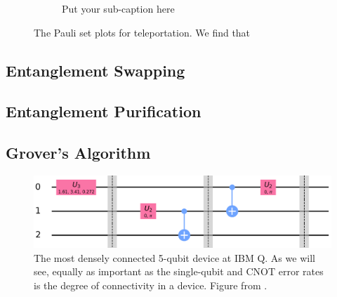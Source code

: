 \begin{figure}
\begin{subfigure}{.5\textwidth}
    \caption{Put your sub-caption here}
    \label{fig:tele_pauli_dev}
  \end{subfigure}
  \caption{The Pauli set plots for teleportation. We find that}
\end{figure}

\subsection{Entanglement Swapping}
\subsection{Entanglement Purification}
\subsection{Grover's Algorithm}

\begin{figure} \centering
\includegraphics[width=\textwidth]{images/teleport_ibmqx2.png}
  \caption{The most densely connected 5-qubit device at IBM Q. As we will see,
equally as important as the single-qubit and CNOT error rates is the degree of
connectivity in a device. Figure from \cite{ibmq_yorktown}.}
  \label{fig:yorktown_connections}
\end{figure}

